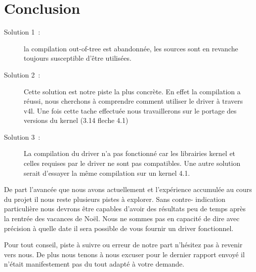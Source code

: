 
\chapter{Conclusion} %

\label{Chapter6} %

\begin{description}
\item[Solution 1 :] la compilation out-of-tree est abandonnée, les sources sont
en revanche toujours susceptible d’être utilisées.

\item[Solution 2 :]Cette solution est notre piste la plus concrète. En effet la
compilation a réussi, nous cherchons à comprendre comment utiliser le driver à
travers v4l. Une fois cette tache effectuée nous travaillerons sur le portage
des versions du kernel (3.14 fleche 4.1)

\item[Solution 3 :]La compilation du driver n’a pas fonctionné car les librairies
 kernel et celles requises par le driver ne sont pas compatibles. Une autre
 solution serait d’essayer la même compilation sur un kernel 4.1.
\end{description}

De part l’avancée que nous avons actuellement et l’expérience accumulée au
cours du projet il nous reste plusieurs pistes à explorer. Sans contre-
indication particulière nous devrons être capables d’avoir des résultats peu de
temps après la rentrée des vacances de Noël. Nous ne sommes pas en capacité de
dire avec précision à quelle date il sera possible de vous fournir un driver
fonctionnel.

Pour tout conseil, piste à suivre ou erreur de notre part n’hésitez pas à
revenir vers nous. De plus nous tenons à nous excuser pour le dernier rapport
envoyé il n’était manifestement pas du tout adapté à votre demande.
